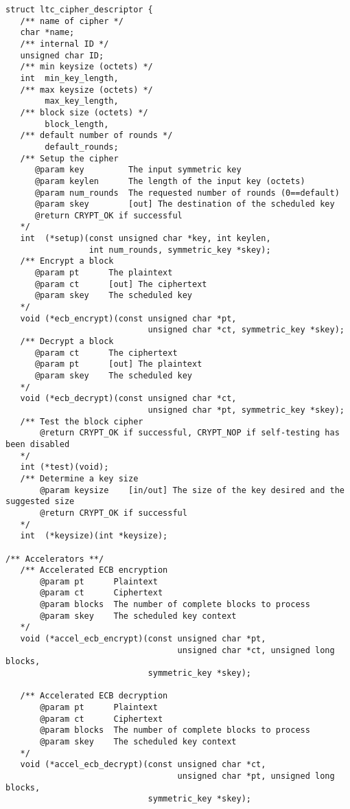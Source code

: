 \documentclass[a4paper]{book}
\begin{document}
\begin{small}
\begin{verbatim}
struct ltc_cipher_descriptor {
   /** name of cipher */
   char *name;
   /** internal ID */
   unsigned char ID;
   /** min keysize (octets) */
   int  min_key_length, 
   /** max keysize (octets) */
        max_key_length, 
   /** block size (octets) */
        block_length, 
   /** default number of rounds */
        default_rounds;
   /** Setup the cipher 
      @param key         The input symmetric key
      @param keylen      The length of the input key (octets)
      @param num_rounds  The requested number of rounds (0==default)
      @param skey        [out] The destination of the scheduled key
      @return CRYPT_OK if successful
   */
   int  (*setup)(const unsigned char *key, int keylen, 
                 int num_rounds, symmetric_key *skey);
   /** Encrypt a block
      @param pt      The plaintext
      @param ct      [out] The ciphertext
      @param skey    The scheduled key
   */
   void (*ecb_encrypt)(const unsigned char *pt, 
                             unsigned char *ct, symmetric_key *skey);
   /** Decrypt a block
      @param ct      The ciphertext
      @param pt      [out] The plaintext
      @param skey    The scheduled key
   */
   void (*ecb_decrypt)(const unsigned char *ct, 
                             unsigned char *pt, symmetric_key *skey);
   /** Test the block cipher
       @return CRYPT_OK if successful, CRYPT_NOP if self-testing has been disabled
   */
   int (*test)(void);
   /** Determine a key size
       @param keysize    [in/out] The size of the key desired and the suggested size
       @return CRYPT_OK if successful
   */
   int  (*keysize)(int *keysize);

/** Accelerators **/
   /** Accelerated ECB encryption 
       @param pt      Plaintext
       @param ct      Ciphertext
       @param blocks  The number of complete blocks to process
       @param skey    The scheduled key context
   */
   void (*accel_ecb_encrypt)(const unsigned char *pt, 
                                   unsigned char *ct, unsigned long blocks, 
                             symmetric_key *skey);

   /** Accelerated ECB decryption 
       @param pt      Plaintext
       @param ct      Ciphertext
       @param blocks  The number of complete blocks to process
       @param skey    The scheduled key context
   */
   void (*accel_ecb_decrypt)(const unsigned char *ct, 
                                   unsigned char *pt, unsigned long blocks, 
                             symmetric_key *skey);


\end{verbatim}
\end{small}
\end{document}
